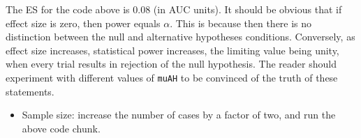 \documentclass[
]{book}
\newenvironment{Shaded}{\begin{snugshade}}{\end{snugshade}}
\newcommand{\CharTok}[1]{\textcolor[rgb]{0.31,0.60,0.02}{#1}}
\newcommand{\CommentTok}[1]{\textcolor[rgb]{0.56,0.35,0.01}{\textit{#1}}}
\newcommand{\DecValTok}[1]{\textcolor[rgb]{0.00,0.00,0.81}{#1}}
\newcommand{\KeywordTok}[1]{\textcolor[rgb]{0.13,0.29,0.53}{\textbf{#1}}}
\newcommand{\NormalTok}[1]{#1}
\newcommand{\OperatorTok}[1]{\textcolor[rgb]{0.81,0.36,0.00}{\textbf{#1}}}
\newcommand{\StringTok}[1]{\textcolor[rgb]{0.31,0.60,0.02}{#1}}
\providecommand{\tightlist}{%
  \setlength{\itemsep}{0pt}\setlength{\parskip}{0pt}}
\begin{document}
\begin{Shaded}
\end{Shaded}

The ES for the code above is 0.08 (in AUC units). It should be obvious that if effect size is zero, then power equals \(\alpha\). This is because then there is no distinction between the null and alternative hypotheses conditions. Conversely, as effect size increases, statistical power increases, the limiting value being unity, when every trial results in rejection of the null hypothesis. The reader should experiment with different values of \texttt{muAH} to be convinced of the truth of these statements.

\begin{itemize}
\tightlist
\item
  Sample size: increase the number of cases by a factor of two, and run the above code chunk.
\end{itemize}
\end{document}
